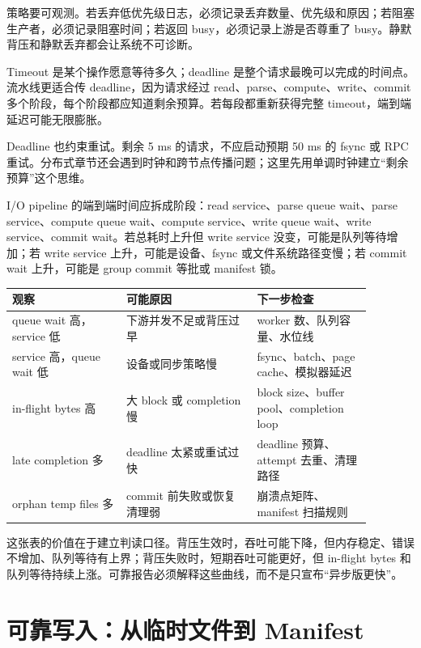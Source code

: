 策略要可观测。若丢弃低优先级日志，必须记录丢弃数量、优先级和原因；若阻塞生产者，必须记录阻塞时间；若返回 busy，必须记录上游是否尊重了 busy。静默背压和静默丢弃都会让系统不可诊断。

Timeout 是某个操作愿意等待多久；deadline 是整个请求最晚可以完成的时间点。流水线更适合传 deadline，因为请求经过 read、parse、compute、write、commit 多个阶段，每个阶段都应知道剩余预算。若每段都重新获得完整 timeout，端到端延迟可能无限膨胀。

Deadline 也约束重试。剩余 5 ms 的请求，不应启动预期 50 ms 的 fsync 或 RPC 重试。分布式章节还会遇到时钟和跨节点传播问题；这里先用单调时钟建立“剩余预算”这个思维。

I/O pipeline 的端到端时间应拆成阶段：read service、parse queue wait、parse service、compute queue wait、compute service、write queue wait、write service、commit wait。若总耗时上升但 write service 没变，可能是队列等待增加；若 write service 上升，可能是设备、fsync 或文件系统路径变慢；若 commit wait 上升，可能是 group commit 等批或 manifest 锁。

\begin{center}
\begin{tabular}{p{0.28\linewidth}p{0.32\linewidth}p{0.28\linewidth}}
\toprule
观察 & 可能原因 & 下一步检查 \\
\midrule
queue wait 高，service 低 & 下游并发不足或背压过早 & worker 数、队列容量、水位线 \\
service 高，queue wait 低 & 设备或同步策略慢 & fsync、batch、page cache、模拟器延迟 \\
in-flight bytes 高 & 大 block 或 completion 慢 & block size、buffer pool、completion loop \\
late completion 多 & deadline 太紧或重试过快 & deadline 预算、attempt 去重、清理路径 \\
orphan temp files 多 & commit 前失败或恢复清理弱 & 崩溃点矩阵、manifest 扫描规则 \\
\bottomrule
\end{tabular}
\end{center}

这张表的价值在于建立判读口径。背压生效时，吞吐可能下降，但内存稳定、错误不增加、队列等待有上界；背压失败时，短期吞吐可能更好，但 in-flight bytes 和队列等待持续上涨。可靠报告必须解释这些曲线，而不是只宣布“异步版更快”。

\section{可靠写入：从临时文件到 Manifest}

